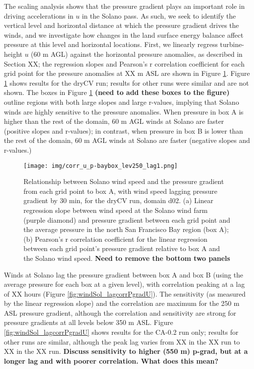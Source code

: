 The scaling analysis shows that the pressure gradient plays an important role in driving accelerations in $u$ in the Solano pass.  As such, we seek to identify the vertical level and horizontal distance at which the pressure gradient drives the winds, and we investigate how changes in the land surface energy balance affect pressure at this level and horizontal locations.  First, we linearly regress turbine-height $u$ (60 m AGL) against the horizontal pressure anomalies, as described in Section XX; the regression slopes and Pearson's r correlation coefficient for each grid point for the pressure anomalies at XX m ASL are shown in Figure \ref{fig:windSol_corrPgradUmap}.  Figure \ref{fig:windSol_corrPgradUmap} shows results for the dryCV run; results for other runs were similar and are not shown.  The boxes in Figure \ref{fig:windSol_corrPgradUmap} \textbf{(need to add these boxes to the figure)} outline regions with both large slopes and large r-values, implying that Solano winds are highly sensitive to the pressure anomalies.  When pressure in box A is higher than the rest of the domain, 60 m AGL winds at Solano are faster (positive slopes and r-values); in contrast, when pressure in box B is lower than the rest of the domain, 60 m AGL winds at Solano are faster (negative slopes and r-values.)

\begin{figure}[here]
\texttt{[image: img/corr\_u\_p-baybox\_lev250\_lag1.png]}
\caption{Relationship between Solano wind speed and the pressure gradient from each grid point to box A, with wind speed lagging pressure gradient by 30 min, for the dryCV run, domain d02.  (a) Linear regression slope between wind speed at the Solano wind farm (purple diamond) and pressure gradient between each grid point and the average pressure in the north San Francisco Bay region (box A); (b) Pearson's r correlation coefficient for the linear regression between each grid point's pressure gradient relative to box A and the Solano wind speed.  \textbf{Need to remove the bottom two panels}}
\label{fig:windSol_corrPgradUmap}
\end{figure}

Winds at Solano lag the pressure gradient between box A and box B (using the average pressure for each box at a given level), with correlation peaking at a lag of XX hours (Figure \ref{fig:windSol_lagcorrPgradU}).  The sensitivity (as measured by the linear regression slope) and the correlation are maximum for the 250 m ASL pressure gradient, although the correlation and sensitivity are strong for pressure gradients at all levels below 350 m ASL.  Figure \ref{fig:windSol_lagcorrPgradU} shows results for the CA-0.2 run only; results for other runs are similar, although the peak lag varies from XX in the XX run to XX in the XX run.  \textbf{Discuss sensitivity to higher (550 m) p-grad, but at a longer lag and with poorer correlation.  What does this mean?}

